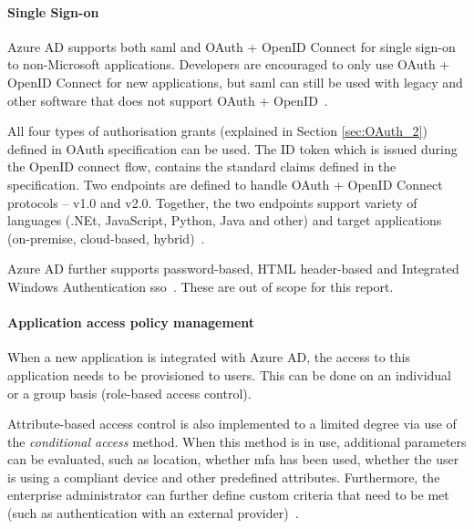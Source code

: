 
\paragraph{Single Sign-on} Azure AD supports both \acrshort{saml} and OAuth + OpenID Connect for single sign-on to non-Microsoft applications. Developers are encouraged to only use OAuth + OpenID Connect for new applications, but \acrshort{saml} can still be used with legacy and other software that does not support OAuth + OpenID~\cite{barbkess2019SingleDirectory}. 

All four types of authorisation grants (explained in Section \ref{sec:OAuth_2}) defined in OAuth specification can be used. The ID token which is issued during the OpenID connect flow, contains the standard claims defined in the specification. Two endpoints are defined to handle OAuth + OpenID Connect protocols -- v1.0 and v2.0. Together, the two endpoints support variety of languages (.NEt, JavaScript, Python, Java and other) and target applications (on-premise, cloud-based, hybrid)~\cite{deGuzman2018AboutPlatform}.

Azure AD further supports password-based, HTML header-based  and Integrated Windows Authentication \acrlong{sso}~\cite{barbkess2019SingleDirectory}. These are out of scope for this report.

\paragraph{Application access policy management} When a new application is integrated with Azure AD, the access to this application needs to be provisioned to users. This can be done on an individual or a group basis (role-based access control). 

Attribute-based access control is also implemented to a limited degree via use of the \textit{conditional access} method. When this method is in use, additional parameters can be evaluated, such as location, whether \acrshort{mfa} has been used, whether the user is using a compliant device and other predefined attributes. Furthermore, the enterprise administrator can further define custom criteria that need to be met (such as authentication with an external provider)~\cite{Vilcinskas2019WhatAccess}.